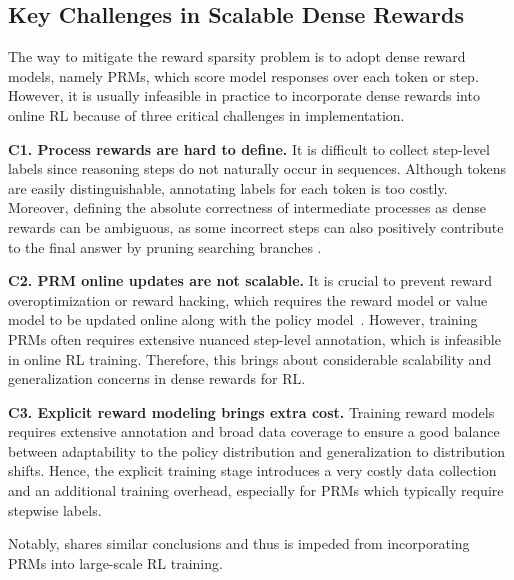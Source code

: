 \subsection{Key Challenges in Scalable Dense Rewards}
\label{sec:challenges}


The way to mitigate the reward sparsity problem is to adopt dense reward models, namely PRMs, which score model responses over each token or step.
However, it is usually infeasible in practice to incorporate dense rewards into online RL because of three critical challenges in implementation.



\textbf{C1. Process rewards are hard to define.}
It is difficult to collect step-level labels since reasoning steps do not naturally occur in sequences. Although tokens are easily distinguishable, annotating labels for each token is too costly.
Moreover, defining the absolute correctness of intermediate processes as dense rewards can be ambiguous, as some incorrect steps can also positively contribute to the final answer by pruning searching branches \citep{Openai2024OpenAIOS,deepseekai2025deepseekr1incentivizingreasoningcapability}. 

\textbf{C2. PRM online updates are not scalable.}
It is crucial to prevent reward overoptimization or reward hacking, which requires the reward model or value model to be updated online along with the policy model~\citep{schulman2017proximal,Gao2022ScalingLF}. 
However, training PRMs often requires extensive nuanced step-level annotation, which is infeasible in online RL training.
Therefore, this brings about considerable scalability and generalization concerns in dense rewards for RL.

\textbf{C3. Explicit reward modeling brings extra cost.}
Training reward models requires extensive annotation and broad data coverage to ensure a good balance between adaptability to the policy distribution and generalization to distribution shifts.
Hence, the explicit training stage introduces a very costly data collection and an additional training overhead, especially for PRMs which typically require stepwise labels.

Notably, \citet{deepseekai2025deepseekr1incentivizingreasoningcapability} shares similar conclusions and thus is impeded from incorporating PRMs into large-scale RL training.


